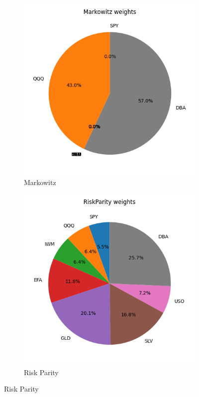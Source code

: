 \documentclass[11pt,a4paper]{article}
\begin{document}
\begin{figure}[h]
  \centering
  \begin{subfigure}[b]{0.48\textwidth}
    \centering
    \includegraphics[width=\linewidth]{../../figures/Markowitz_weights_generated.png}
    \caption{Markowitz}
  \end{subfigure}
  \hfill
  \begin{subfigure}[b]{0.48\textwidth}
    \centering
    \includegraphics[width=\linewidth]{../../figures/RiskParity_weights_generated.png}
    \caption{Risk Parity}
  \end{subfigure}
  

\end{figure}
\end{document}

